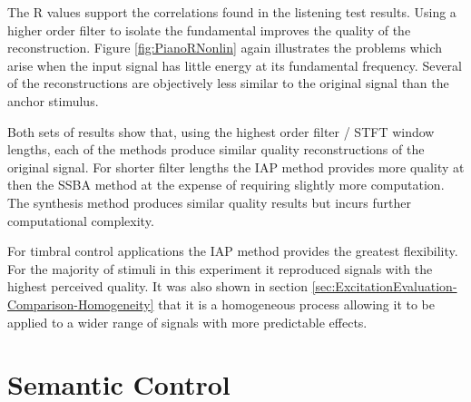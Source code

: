 	The R values support the correlations found in the listening test results. Using a higher order filter
	to isolate the fundamental improves the quality of the reconstruction. Figure \ref{fig:PianoRNonlin} again
	illustrates the problems which arise when the input signal has little energy at its fundamental frequency. Several
	of the reconstructions are objectively less similar to the original signal than the anchor stimulus.

	Both sets of results show that, using the highest order filter / STFT window lengths, each of the methods produce
	similar quality reconstructions of the original signal. For shorter filter lengths the IAP method provides more
	quality at then the SSBA method at the expense of requiring slightly more computation. The synthesis method produces
	similar quality results but incurs further computational complexity. 

	For timbral control applications the IAP method provides the greatest flexibility. For the majority of stimuli in
	this experiment it reproduced signals with the highest perceived quality. It was also shown in section
	\ref{sec:ExcitationEvaluation-Comparison-Homogeneity} that it is a homogeneous process allowing it to be applied to
	a wider range of signals with more predictable effects.

\section{Semantic Control}
\label{sec:PerceptualExperiments-SemanticControl}
